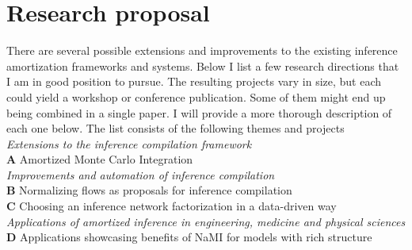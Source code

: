 \documentclass[12pt]{article}
\begin{document}
\section{Research proposal}
There are several possible extensions and improvements to the existing inference amortization frameworks and systems. 
Below I list a few research directions that I am in good position to pursue.
The resulting projects vary in size, but each could yield a workshop or conference publication.
Some of them might end up being combined in a single paper.
I will provide a more thorough description of each one below.
The list consists of the following themes and projects\\
\emph{Extensions to the inference compilation framework}\\
\textbf{A} \quad Amortized Monte Carlo Integration\\
\emph{Improvements and automation of inference compilation}\\
\textbf{B} \quad Normalizing flows as proposals for inference compilation\\
\textbf{C} \quad Choosing an inference network factorization in a data-driven way\\
\emph{Applications of amortized inference in engineering, medicine and physical sciences}\\
\textbf{D} \quad Applications showcasing benefits of NaMI for models with rich structure\\
\end{document}
